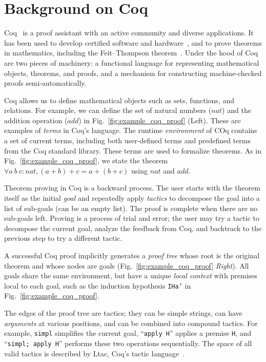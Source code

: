 \documentclass{article}
\begin{document}
\section{Background on Coq}


Coq~\citep{barras1997coq} is a proof assistant with an active community and diverse applications.
It has been used to develop certified software and hardware~\citep{leroy2009formal, paulin1995circuits}, and to prove theorems in mathematics, including the Feit--Thompson theorem~\citep{gonthier2013machine}.
Under the hood of Coq are two pieces of machinery: 
 a functional language for representing mathematical objects, theorems, and proofs, and 
a mechanism for constructing machine-checked proofs semi-automatically.

Coq allows us to define mathematical objects such as sets, functions, and relations. 
For example, we can define the set of natural numbers ($nat$) and the addition operation ($add$) in Fig.~\ref{fig:example_coq_proof} (Left).
These are examples of \textit{terms} in Coq's language.
The runtime \textit{environment} of COq contains a set of current terms, including both user-defined terms and predefined terms from the Coq standard library.
These terms are used to formalize theorems.
As in Fig.~\ref{fig:example_coq_proof}, we state the theorem $\forall a~b~c : nat, (a + b) + c = a + (b + c)$ using $nat$ and $add$.

Theorem proving in Coq is a backward process.
The user starts with the theorem itself as the initial \textit{goal} and repeatedly apply \textit{tactics} to 
decompose the goal into a list of sub-goals (can be an empty list).
The proof is complete when there are no sub-goals left.
Proving is a process of trial and error; the user may try a tactic to decompose the current goal, analyze the feedback from Coq, and backtrack to the previous step to try a different tactic.

A successful Coq proof implicitly generates a \textit{proof tree} whose root is the original theorem and whose nodes are goals (Fig.~\ref{fig:example_coq_proof} \textit{Right}).
All goals share the same environment, but have a unique \textit{local context} with premises local to each goal, such as the induction hypothesis \texttt{IHa'} in Fig.~\ref{fig:example_coq_proof}.


The edges of the proof tree are tactics; they can be simple strings, can have \textit{arguments} at various positions, and can be combined into compound tactics.
For example, \texttt{simpl} simplifies the current goal, ``\texttt{apply H}'' applies a premise \texttt{H}, and ``\texttt{simpl; apply H}'' performs these two operations sequentially.
The space of all valid tactics is described by Ltac, Coq's tactic language~\citep{delahaye2000tactic}.
\end{document}
